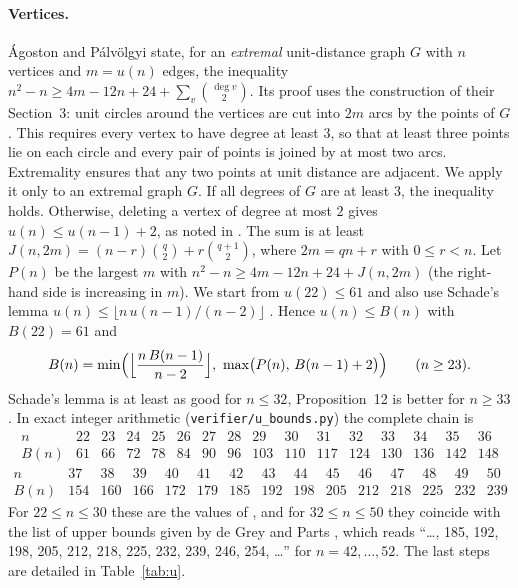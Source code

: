 \documentclass[10pt,a4paper]{article}
\begin{document}
\paragraph{Vertices.} \'Agoston and P\'alv\"olgyi \cite[Prop.~12]{AP} state, for an \emph{extremal}
unit-distance graph $G$ with $n$ vertices and $m=u(n)$ edges, the inequality
$n^2-n\ge 4m-12n+24+\sum_v\binom{\deg v}{2}$. Its proof uses the construction of their Section~3:
unit circles around the vertices are cut into $2m$ arcs by the points of $G$. This requires every
vertex to have degree at least $3$, so that at least three points lie on each circle and every pair
of points is joined by at most two arcs. Extremality ensures that any two points at unit distance are
adjacent. We apply it only to an extremal graph $G$. If all degrees of $G$ are at least $3$, the
inequality holds. Otherwise, deleting a vertex of degree at most $2$ gives $u(n)\le u(n-1)+2$, as
noted in \cite[note~6, p.~12]{AP}. The sum is at least
$J(n,2m)=(n-r)\binom{q}{2}+r\binom{q+1}{2}$, where $2m=qn+r$ with $0\le r<n$. Let $P(n)$ be the
largest $m$ with $n^2-n\ge 4m-12n+24+J(n,2m)$ (the right-hand side is increasing in $m$). We start from
$u(22)\le61$ \cite{AMP} and also use Schade's lemma $u(n)\le\lfloor n\,u(n-1)/(n-2)\rfloor$
\cite[Lemma~2]{AMP}. Hence $u(n)\le B(n)$ with $B(22)=61$ and
\[
B(n)=\min\Bigl(\Bigl\lfloor \frac{n\,B(n-1)}{n-2}\Bigr\rfloor,\ \max\bigl(P(n),\,B(n-1)+2\bigr)\Bigr)\qquad(n\ge23).
\]
Schade's lemma is at least as good for $n\le32$, Proposition~12 is better for $n\ge33$. In exact integer arithmetic
(\texttt{verifier/u\_bounds.py}) the complete chain is
\[
\begin{array}{c|ccccccccccccccc}
n & 22 & 23 & 24 & 25 & 26 & 27 & 28 & 29 & 30 & 31 & 32 & 33 & 34 & 35 & 36\\ \hline
B(n) & 61 & 66 & 72 & 78 & 84 & 90 & 96 & 103 & 110 & 117 & 124 & 130 & 136 & 142 & 148
\end{array}
\]
\[
\begin{array}{c|cccccccccccccc}
n & 37 & 38 & 39 & 40 & 41 & 42 & 43 & 44 & 45 & 46 & 47 & 48 & 49 & 50\\ \hline
B(n) & 154 & 160 & 166 & 172 & 179 & 185 & 192 & 198 & 205 & 212 & 218 & 225 & 232 & 239
\end{array}
\]
For $22\le n\le30$ these are the values of \cite[Thm.~1(b)]{AMP}, and for $32\le n\le50$ they coincide with the
list of upper bounds given by de Grey and Parts \cite[note~3]{dGP}, which reads
``\dots, 185, 192, 198, 205, 212, 218, 225, 232, 239, 246, 254, \dots'' for $n=42,\dots,52$.
The last steps are detailed in Table~\ref{tab:u}.
\end{document}
